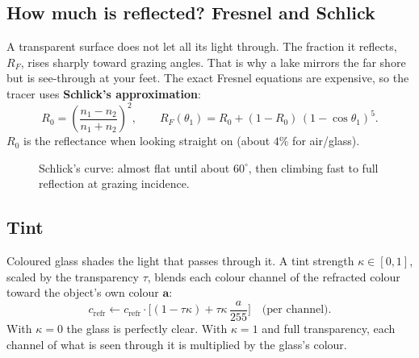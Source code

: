 \documentclass[11pt,a4paper]{article}
\newcommand{\vv}[1]{\mathbf{#1}}
\begin{document}
\subsection{How much is reflected? Fresnel and Schlick}

A transparent surface does not let all its light through. The fraction it
reflects, $R_F$, rises sharply toward grazing angles. That is why a lake mirrors
the far shore but is see-through at your feet. The exact Fresnel equations are
expensive, so the tracer uses \textbf{Schlick's approximation}:
\[
  R_0 = \left(\frac{n_1-n_2}{n_1+n_2}\right)^2,\qquad
  R_F(\theta_1) = R_0 + (1-R_0)\,(1-\cos\theta_1)^5 .
\]
$R_0$ is the reflectance when looking straight on (about $4\%$ for air/glass).

\begin{figure}[h]
\centering
{}
\caption{Schlick's curve: almost flat until about $60^\circ$, then climbing fast
to full reflection at grazing incidence.}
\end{figure}

\subsection{Tint}

Coloured glass shades the light that passes through it. A tint strength
$\kappa\in[0,1]$, scaled by the transparency $\tau$, blends each colour channel
of the refracted colour toward the object's own colour $\vv a$:
\[
  c_{\text{refr}} \leftarrow c_{\text{refr}}\cdot\Big[(1-\tau\kappa) + \tau\kappa\,\frac{a}{255}\Big]
  \quad\text{(per channel)}.
\]
With $\kappa=0$ the glass is perfectly clear. With $\kappa=1$ and full
transparency, each channel of what is seen through it is multiplied by the
glass's colour.
\end{document}
